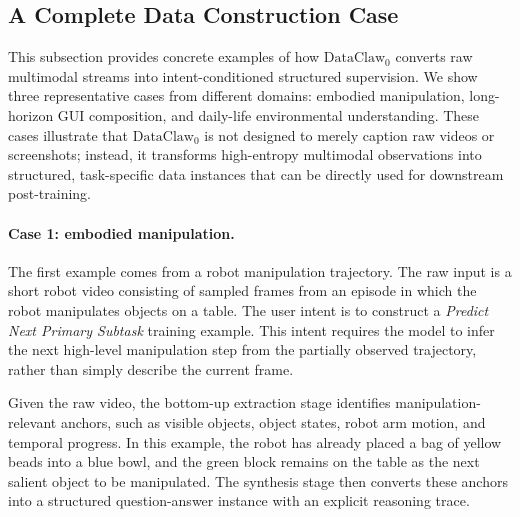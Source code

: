 \documentclass{llmxive}
\begin{document}
\subsection{A Complete Data Construction Case}
\label{app:complete_case}

This subsection provides concrete examples of how $\text{DataClaw}_0$ converts raw multimodal streams into intent-conditioned structured supervision. We show three representative cases from different domains: embodied manipulation, long-horizon GUI composition, and daily-life environmental understanding. These cases illustrate that $\text{DataClaw}_0$ is not designed to merely caption raw videos or screenshots; instead, it transforms high-entropy multimodal observations into structured, task-specific data instances that can be directly used for downstream post-training.

\paragraph{Case 1: embodied manipulation.}
The first example comes from a robot manipulation trajectory. The raw input is a short robot video consisting of sampled frames from an episode in which the robot manipulates objects on a table. The user intent is to construct a \emph{Predict Next Primary Subtask} training example. This intent requires the model to infer the next high-level manipulation step from the partially observed trajectory, rather than simply describe the current frame.

Given the raw video, the bottom-up extraction stage identifies manipulation-relevant anchors, such as visible objects, object states, robot arm motion, and temporal progress. In this example, the robot has already placed a bag of yellow beads into a blue bowl, and the green block remains on the table as the next salient object to be manipulated. The synthesis stage then converts these anchors into a structured question-answer instance with an explicit reasoning trace.
\end{document}
